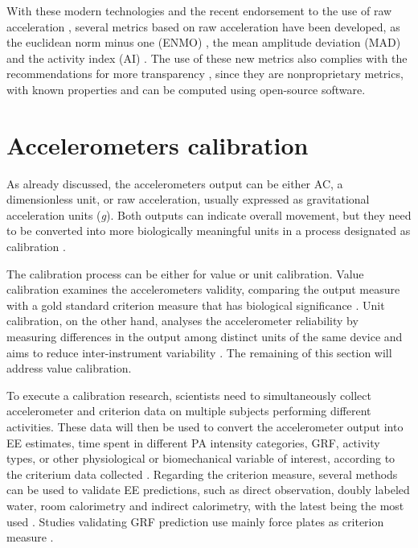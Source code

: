 \documentclass[12pt]{article}
\begin{document}
With these modern technologies and the recent endorsement to the use of raw acceleration , several metrics based on raw acceleration have been developed, as the euclidean norm minus one (ENMO) , the mean amplitude deviation (MAD)  and the activity index (AI) . The use of these new metrics also complies with the recommendations for more transparency , since they are nonproprietary metrics, with known properties and can be computed using open-source software.

\section*{Accelerometers calibration}

As already discussed, the accelerometers output can be either AC, a dimensionless unit, or raw acceleration, usually expressed as gravitational acceleration units (\textit{g}). Both outputs can indicate overall movement, but they need to be converted into more biologically meaningful units in a process designated as calibration .

The calibration process can be either for value or unit calibration. Value calibration examines the accelerometers validity, comparing the output measure with a gold standard criterion measure that has biological significance . Unit calibration, on the other hand, analyses the accelerometer reliability by measuring differences in the output among distinct units of the same device and aims to reduce inter-instrument variability . The remaining of this section will address value calibration.

To execute a calibration research, scientists need to simultaneously collect accelerometer and criterion data on multiple subjects performing different activities. These data will then be used to convert the accelerometer output into EE estimates, time spent in different PA intensity categories, GRF, activity types, or other physiological or biomechanical variable of interest, according to the criterium data collected . Regarding the criterion measure, several methods can be used to validate EE predictions, such as direct observation, doubly labeled water, room calorimetry and indirect calorimetry, with the latest being the most used . Studies validating GRF prediction use mainly force plates as criterion measure .
\end{document}
